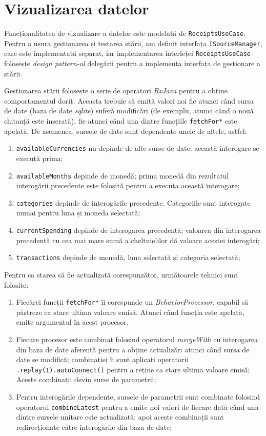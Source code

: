 \section{Vizualizarea datelor}

Funcționalitatea de vizualizare a datelor este modelată de \texttt{ReceiptsUseCase}. Pentru a ușura gestionarea și testarea stării, am definit interfața \texttt{ISourceManager}, care este implementată separat, iar implementarea interfeței \texttt{ReceiptsUseCase} folosește \emph{design pattern-ul} delegării pentru a implementa interfața de gestionare a stării.



Gestionarea stării folosește o serie de operatori \emph{RxJava} pentru a obține comportamentul dorit. Aceasta trebuie să emită valori noi fie atunci când sursa de date (baza de date \emph{sqlite}) suferă modificări (de exemplu, atunci când o nouă chitanță este inserată), fie atunci când una dintre funcțiile \texttt{fetchFor*} este apelată. De asemenea, sursele de date sunt dependente unele de altele, astfel:
\begin{enumerate}
  \item \texttt{availableCurrencies} nu depinde de alte surse de date; această interogare se execută prima;
  \item \texttt{availableMonths} depinde de monedă; prima monedă din rezultatul interogării precedente este folosită pentru a executa această interogare;
  \item \texttt{categories} depinde de interogările precedente. Categoriile sunt interogate numai pentru luna și moneda selectată; 
  \item \texttt{currentSpending} depinde de interogarea precedentă; valoarea din interogarea precedentă cu cea mai mare sumă a cheltuielilor dă valoare acestei interogări;
  \item \texttt{transactions} depinde de monedă, luna selectată și categoria selectată;
\end{enumerate}

Pentru ca starea să fie actualizată corespunzător, următoarele tehnici sunt folosite:
\begin{enumerate}
  \item Fiecărei funcții \texttt{fetchFor*} îi corespunde un \emph{BehaviorProcessor}, capabil să păstreze ca stare ultima valoare emisă. Atunci când funcția este apelată, emite argumentul în acest procesor.
  \item Fiecare procesor este combinat folosind operatorul \emph{mergeWith} cu interogarea din baza de date aferentă pentru a obține actualizări atunci când sursa de date se modifică; combinației îi sunt aplicați operatorii \texttt{.replay(1).autoConnect()} pentru a reține ca stare ultima valoare emisă; Aceste combinații devin surse de parametrii;
  \item Pentru interogările dependente, sursele de parametrii sunt combinate folosind operatorul \texttt{combineLatest} pentru a emite noi valori de fiecare dată când una dintre sursele unitare este actualizată; apoi aceste combinații sunt redirecționate către interogările din baza de date;
\end{enumerate}

